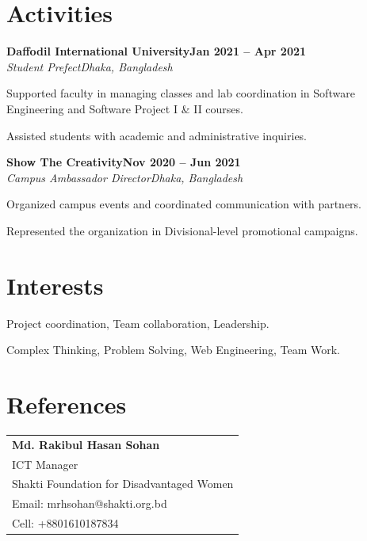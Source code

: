 \documentclass[letterpaper,10pt]{article}
\newcommand{\heading}[2]{\hspace{10pt}#1\hfill#2\\}
\newcommand{\headingBf}[2]{\heading{\textbf{#1}}{\textbf{#2}}}
\newcommand{\headingIt}[2]{\heading{\textit{#1}}{\textit{#2}}}
\newenvironment{resume_list}{
  \vspace{-7pt}
  \begin{itemize}[itemsep=-2px, parsep=1pt, leftmargin=30pt]
}{
  \end{itemize}
}
\begin{document}
\section{Activities}

\headingBf{Daffodil International University}{Jan 2021 -- Apr 2021}
\headingIt{Student Prefect}{Dhaka, Bangladesh}
\begin{resume_list}
  \item Supported faculty in managing classes and lab coordination in Software Engineering and Software Project I \& II courses.
  \item Assisted students with academic and administrative inquiries.
\end{resume_list}

\headingBf{Show The Creativity}{Nov 2020 -- Jun 2021}
\headingIt{Campus Ambassador Director}{Dhaka, Bangladesh}
\begin{resume_list}
  \item Organized campus events and coordinated communication with partners.
  \item Represented the organization in Divisional-level promotional campaigns.
\end{resume_list}

\section{Interests}
\begin{resume_list}
  \item Project coordination, Team collaboration, Leadership.
  \item Complex Thinking, Problem Solving, Web Engineering, Team Work.
\end{resume_list}

\section{References}
\begin{tabular}{@{}p{10cm}@{}}
\textbf{Md. Rakibul Hasan Sohan} \\
ICT Manager \\
Shakti Foundation for Disadvantaged Women \\
Email: mrhsohan@shakti.org.bd \\
Cell: +8801610187834 \\
\end{tabular}
\end{document}
